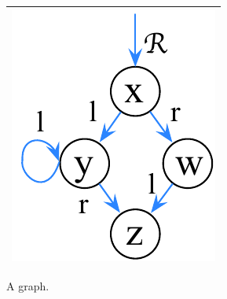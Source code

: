 \begin{figure}
	\centering
	\begin{tabular}{|c |}
		\hline
			\includegraphics[scale=0.27]{Sections/FurtherExamples/Images/graphWithRootEdge.pdf} \\
		\hline
	\end{tabular}
\caption{A graph.}
\label{fig:graphAndTree}
\end{figure}


